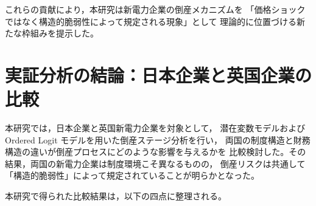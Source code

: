 これらの貢献により，本研究は新電力企業の倒産メカニズムを
「価格ショックではなく構造的脆弱性によって規定される現象」として
理論的に位置づける新たな枠組みを提示した。



\section{実証分析の結論：日本企業と英国企業の比較}

本研究では，日本企業と英国新電力企業を対象として，
潜在変数モデルおよび Ordered Logit モデルを用いた倒産ステージ分析を行い，
両国の制度構造と財務構造の違いが倒産プロセスにどのような影響を与えるかを
比較検討した。その結果，両国の新電力企業は制度環境こそ異なるものの，
倒産リスクは共通して「構造的脆弱性」によって規定されていることが明らかとなった。

本研究で得られた比較結果は，以下の四点に整理される。

